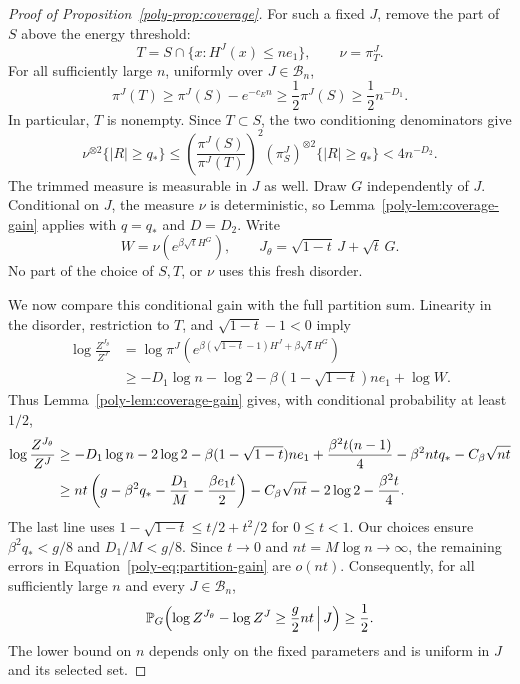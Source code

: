\begin{proof}[Proof of Proposition~\ref{poly-prop:coverage}]
For such a fixed $J$, remove the part of $S$ above the energy threshold:
\[
 T=S\cap\{x:H^J(x)\le ne_1\},\qquad \nu=\pi_T^J.
\]
For all sufficiently large $n$, uniformly over $J\in\mathcal B_n$,
\begin{equation}\label{poly-eq:trimmed-mass}
 \pi^J(T)\ge\pi^J(S)-e^{-c_En}
       \ge\frac12\pi^J(S)\ge\frac12n^{-D_1}.
\end{equation}
In particular, $T$ is nonempty. Since $T\subset S$, the two conditioning
denominators give
\begin{equation}\label{poly-eq:trimmed-pairs}
 \nu^{\otimes2}\{|R|\ge q_*\}
 \le\left(\frac{\pi^J(S)}{\pi^J(T)}\right)^2
       (\pi_S^J)^{\otimes2}\{|R|\ge q_*\}
 <4n^{-D_2}.
\end{equation}
The trimmed measure is measurable in $J$ as well. Draw $G$ independently
of $J$. Conditional on $J$, the measure $\nu$ is deterministic, so
Lemma~\ref{poly-lem:coverage-gain} applies with $q=q_*$ and $D=D_2$.
Write
\[
 W=\nu(e^{\beta\sqrt t H^G}),\qquad
 J_\theta=\sqrt{1-t}\,J+\sqrt t\,G.
\]
No part of the choice of $S,T$, or $\nu$ uses this fresh disorder.

We now compare this conditional gain with the full partition sum.
Linearity in the disorder, restriction to $T$, and
$\sqrt{1-t}-1<0$ imply
\begin{align*}
 \log\frac{Z^{J_\theta}}{Z^J}
 &=\log\pi^J\!\left(
      e^{\beta(\sqrt{1-t}-1)H^J+\beta\sqrt t H^G}\right)\\
 &\ge-D_1\log n-\log2
       -\beta(1-\sqrt{1-t})ne_1+\log W.
\end{align*}
Thus Lemma~\ref{poly-lem:coverage-gain} gives, with conditional
probability at least $1/2$,
\begin{align}
 \log\frac{Z^{J_\theta}}{Z^J}
 &\ge-D_1\log n-2\log2
       -\beta(1-\sqrt{1-t})ne_1
       +\frac{\beta^2t(n-1)}4
       -\beta^2ntq_*-C_\beta\sqrt{nt}\notag\\
 &\ge nt\left(g-\beta^2q_*-\frac{D_1}{M}
                         -\frac{\beta e_1t}{2}\right)
       -C_\beta\sqrt{nt}-2\log2-\frac{\beta^2t}{4}.
 \label{poly-eq:partition-gain}
\end{align}
The last line uses
$1-\sqrt{1-t}\le t/2+t^2/2$ for $0\le t<1$.
Our choices ensure $\beta^2q_*<g/8$ and $D_1/M<g/8$.
Since $t\to0$ and $nt=M\log n\to\infty$, the remaining errors in
Equation~\eqref{poly-eq:partition-gain} are $o(nt)$. Consequently,
for all sufficiently large $n$ and every $J\in\mathcal B_n$,
\begin{equation}\label{poly-eq:bad-increment}
 \mathbb P_G\!\left(
   \log Z^{J_\theta}-\log Z^J\ge\frac g2nt\,\middle|\,J
 \right)\ge\frac12.
\end{equation}
The lower bound on $n$ depends only on the fixed parameters and is
uniform in $J$ and its selected set.


\end{proof}
